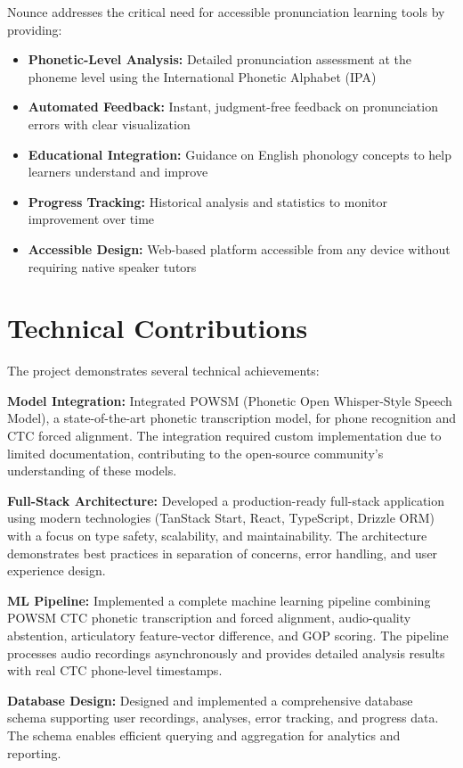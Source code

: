 \documentclass[a4paper,12pt]{report}
\begin{document}
Nounce addresses the critical need for accessible pronunciation learning tools by providing:
\begin{itemize}
    \item \textbf{Phonetic-Level Analysis:} Detailed pronunciation assessment at the phoneme level using the International Phonetic Alphabet (IPA)
    \item \textbf{Automated Feedback:} Instant, judgment-free feedback on pronunciation errors with clear visualization
    \item \textbf{Educational Integration:} Guidance on English phonology concepts to help learners understand and improve
    \item \textbf{Progress Tracking:} Historical analysis and statistics to monitor improvement over time
    \item \textbf{Accessible Design:} Web-based platform accessible from any device without requiring native speaker tutors
\end{itemize}

\section{Technical Contributions}

The project demonstrates several technical achievements:

\textbf{Model Integration:} Integrated POWSM \cite{powsm} (Phonetic Open Whisper-Style Speech Model), a state-of-the-art phonetic transcription model, for phone recognition and CTC forced alignment. The integration required custom implementation due to limited documentation, contributing to the open-source community's understanding of these models.

\textbf{Full-Stack Architecture:} Developed a production-ready full-stack application using modern technologies (TanStack Start, React, TypeScript, Drizzle ORM) with a focus on type safety, scalability, and maintainability. The architecture demonstrates best practices in separation of concerns, error handling, and user experience design.

\textbf{ML Pipeline:} Implemented a complete machine learning pipeline combining POWSM CTC phonetic transcription and forced alignment, audio-quality abstention, articulatory feature-vector difference, and GOP scoring. The pipeline processes audio recordings asynchronously and provides detailed analysis results with real CTC phone-level timestamps.

\textbf{Database Design:} Designed and implemented a comprehensive database schema supporting user recordings, analyses, error tracking, and progress data. The schema enables efficient querying and aggregation for analytics and reporting.
\end{document}
